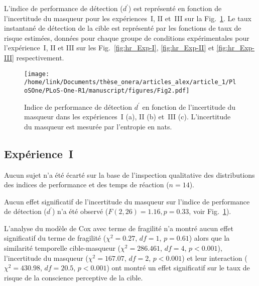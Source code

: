 L'indice de performance de détection ($d^\prime$) est représenté en fonction de l'incertitude du masqueur pour les expériences~I, II et~III sur la Fig.~\ref{fig:dprime_mu}. 
Le taux instantané de détection de la cible est représenté par les fonctions de taux de risque estimées, données pour chaque groupe de conditions expérimentales pour l'expérience~I, II et III sur les Fig.~\ref{fig:hr_Exp-I}, \ref{fig:hr_Exp-II} et \ref{fig:hr_Exp-III} respectivement. 

\begin{figure}[!t]
\centering
\texttt{[image: /home/link/Documents/thèse\_onera/articles\_alex/article\_1/PloSOne/PLoS-One-R1/manuscript/figures/Fig2.pdf]}
\caption[Indice de performance de détection $d^\prime$ en fonction de l'incertitude du masqueur]{Indice de performance de détection $d^\prime$ en fonction de l'incertitude du masqueur dans les expériences~I (a), II (b) et~III (c). L'incertitude du masqueur est mesurée par l'entropie en nats.} \label{fig:dprime_mu} 
\end{figure}

\subsection{Expérience~I}
\label{chapitre4resultatsexpI}

Aucun sujet n'a été écarté sur la base de l'inspection qualitative des distributions des indices de performance et des temps de réaction ($n=14$).

Aucun effet significatif de l'incertitude du masqueur sur l'indice de performance de détection ($d^\prime$) n'a été observé (${F(2,26)=1.16}, {p=0.33}$, voir Fig.~\ref{fig:dprime_mu}).

L'analyse du modèle de Cox avec terme de fragilité n'a montré aucun effet significatif du terme de fragilité (${\chi^2=0.27}$, ${df=1}$, ${p=0.61}$) alors que la similarité temporelle cible-masqueur (${\chi^2=286.461}$, ${df=4}$, ${p<0.001}$), l'incertitude du masqueur (${\chi^2=167.07}$, ${df=2}$, ${p<0.001}$) et leur interaction (${\chi^2=430.98}$, ${df=20.5}$, ${p<0.001}$) ont montré un effet significatif sur le taux de risque de la conscience perceptive de la cible.

